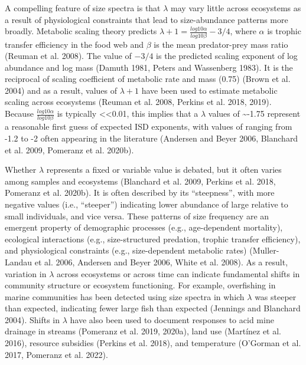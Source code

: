 \documentclass[
  12pt,
]{article}
\begin{document}
A compelling feature of size spectra is that \(\lambda\) may vary little
across ecosystems as a result of physiological constraints that lead to
size-abundance patterns more broadly. Metabolic scaling theory predicts
\(\lambda + 1 = \frac{log10\alpha}{log10\beta} - 3/4\), where \(\alpha\)
is trophic transfer efficiency in the food web and \(\beta\) is the mean
predator-prey mass ratio (Reuman et al. 2008). The value of \(-3/4\) is
the predicted scaling exponent of log abundance and log mass (Damuth
1981, Peters and Wassenberg 1983). It is the reciprocal of scaling
coefficient of metabolic rate and mass (0.75) (Brown et al. 2004) and as
a result, values of \(\lambda + 1\) have been used to estimate metabolic
scaling across ecosystems (Reuman et al. 2008, Perkins et al. 2018,
2019). Because \(\frac{log10\alpha}{log10\beta}\) is typically
\textless\textless0.01, this implies that a \(\lambda\) values of
\textasciitilde-1.75 represent a reasonable first guess of expected ISD
exponents, with values of ranging from -1.2 to -2 often appearing in the
literature (Andersen and Beyer 2006, Blanchard et al. 2009, Pomeranz et
al. 2020b).

Whether \(\lambda\) represents a fixed or variable value is debated, but
it often varies among samples and ecosystems (Blanchard et al. 2009,
Perkins et al. 2018, Pomeranz et al. 2020b). It is often described by
its ``steepness'', with more negative values (i.e., ``steeper'')
indicating lower abundance of large relative to small individuals, and
vice versa. These patterns of size frequency are an emergent property of
demographic processes (e.g., age-dependent mortality), ecological
interactions (e.g., size-structured predation, trophic transfer
efficiency), and physiological constraints (e.g., size-dependent
metabolic rates) (Muller-Landau et al. 2006, Andersen and Beyer 2006,
White et al. 2008). As a result, variation in \(\lambda\) across
ecosystems or across time can indicate fundamental shifts in community
structure or ecosystem functioning. For example, overfishing in marine
communities has been detected using size spectra in which \(\lambda\)
was steeper than expected, indicating fewer large fish than expected
(Jennings and Blanchard 2004). Shifts in \(\lambda\) have also been used
to document responses to acid mine drainage in streams (Pomeranz et al.
2019, 2020a), land use (Martínez et al. 2016), resource subsidies
(Perkins et al. 2018), and temperature (O'Gorman et al. 2017, Pomeranz
et al. 2022).
\end{document}
